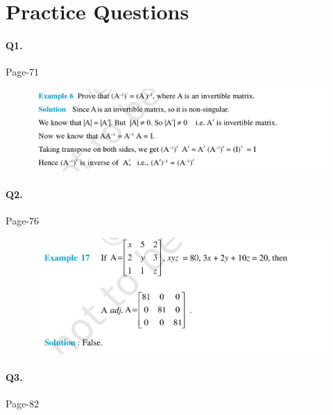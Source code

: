 \documentclass{article}
\begin{document}
\section*{Practice Questions}
\paragraph{Q1.}
\begin{flushright}
Page-71
\end{flushright}

\begin{figure}[H]
    \includegraphics[scale=0.5]{determinants_l3_ps_1.png}
\end{figure}
\clearpage
\paragraph{Q2.}
\begin{flushright}
Page-76
\end{flushright}

\begin{figure}[H]
    \includegraphics[scale=0.5]{determinants_l3_ps_2.png}
\end{figure}

\clearpage
\paragraph{Q3.}
\begin{flushright}
Page-82
\end{flushright}
\end{document}
